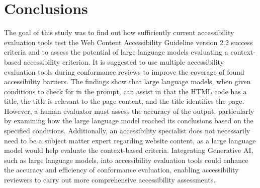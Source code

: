 \chapter{Conclusions\label{conclusions}}

The goal of this study was to find out how sufficiently current accessibility evaluation tools test the Web Content Accessibility Guideline version 2.2 success criteria and to assess the potential of large language models evaluating a context-based accessibility criterion. It is suggested to use multiple accessibility evaluation tools during conformance reviews to improve the coverage of found accessibility barriers. The findings show that large language models, when given conditions to check for in the prompt, can assist in that the HTML code has a title, the title is relevant to the page content, and the title identifies the page. However, a human evaluator must assess the accuracy of the output, particularly by examining how the large language model reached its conclusions based on the specified conditions. Additionally, an accessibility specialist does not necessarily need to be a subject matter expert regarding website content, as a large language model would help evaluate the context-based criteria. Integrating Generative AI, such as large language models, into accessibility evaluation tools could enhance the accuracy and efficiency of conformance evaluation, enabling accessibility reviewers to carry out more comprehensive accessibility assessments.
